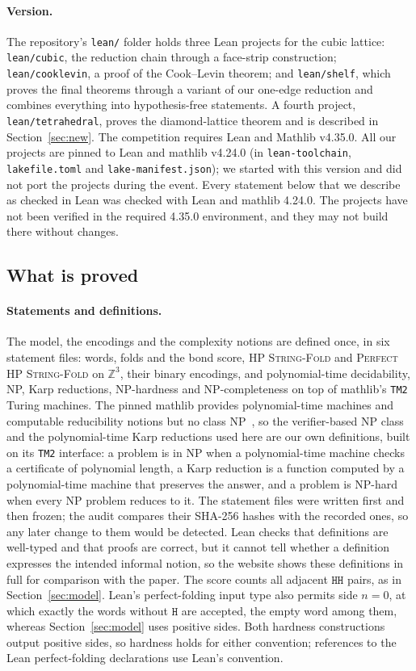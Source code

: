 \documentclass[11pt,letterpaper]{article}
\theoremstyle{definition}
\theoremstyle{remark}
\newcommand{\Hh}{\mathtt{H}}
\newcommand{\lean}[1]{\texttt{#1}}
\newcommand{\Z}{\mathbb{Z}}
\newcommand{\prob}[1]{\textup{\textsc{#1}}}
\newcommand{\tetrapath}{lean/tetrahedral}
\begin{document}
\paragraph{Version.}
The repository's \lean{lean/} folder holds three Lean projects for the cubic lattice:
\lean{lean/cubic}, the reduction chain through a face-strip construction; \lean{lean/cooklevin}, a
proof of the Cook--Levin theorem; and \lean{lean/shelf}, which proves the final theorems through a
variant of our one-edge reduction and combines everything into hypothesis-free statements. A fourth
project, \lean{\tetrapath}, proves the diamond-lattice theorem and is described in
Section~\ref{sec:new}. The competition requires Lean and Mathlib v4.35.0. All our projects are
pinned to Lean and mathlib v4.24.0 (in \lean{lean-toolchain}, \lean{lakefile.toml} and
\lean{lake-manifest.json}); we started with this version and did not port the projects during the
event. Every statement below that
we describe as checked in Lean was checked with Lean and mathlib 4.24.0. The projects have not been
verified in the required 4.35.0 environment, and they may not build there without changes.

\subsection{What is proved}

\paragraph{Statements and definitions.}
The model, the encodings and the complexity notions are defined once, in six statement files: words,
folds and the bond score, \prob{HP String-Fold} and \prob{Perfect HP String-Fold} on $\Z^3$, their
binary encodings, and polynomial-time decidability, NP, Karp reductions, NP-hardness and
NP-completeness on top of mathlib's \lean{TM2} Turing machines. The pinned mathlib provides
polynomial-time machines and computable reducibility notions but no class NP~\cite{mathlib}, so the
verifier-based NP class and the polynomial-time Karp reductions used here are our own definitions,
built on its \lean{TM2} interface: a problem is in NP when a polynomial-time machine checks a certificate of polynomial
length, a Karp reduction is a function computed by a polynomial-time machine that preserves the
answer, and a problem is NP-hard when every NP problem reduces to it. The statement files were
written first and then frozen; the audit compares their SHA-256 hashes with the recorded ones, so any
later change to them would be detected. Lean checks that definitions are well-typed and that proofs
are correct, but it cannot tell whether a definition expresses the intended informal notion, so the
website shows these definitions in full for comparison with the paper. The score counts all adjacent
$\Hh\Hh$ pairs, as in Section~\ref{sec:model}. Lean's perfect-folding input type also permits side
$n=0$, at which exactly the words without $\Hh$ are accepted, the empty word among them, whereas
Section~\ref{sec:model} uses positive sides. Both hardness constructions output positive sides, so
hardness holds for either convention; references to the Lean perfect-folding declarations use
Lean's convention.
\end{document}
